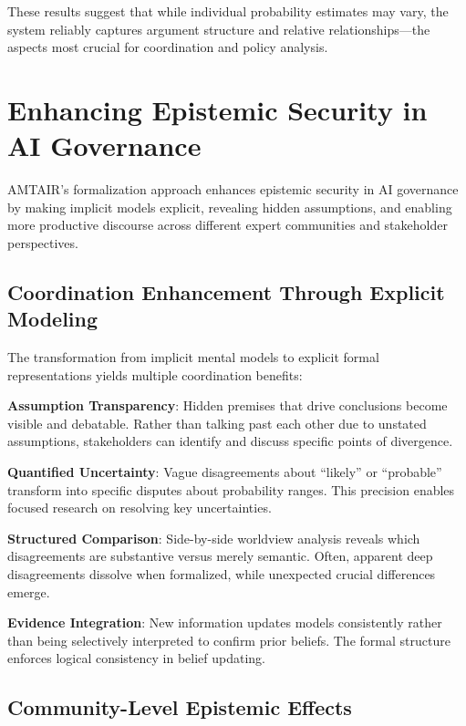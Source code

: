 \documentclass[
  11pt,
  letterpaper,
]{book}
\begin{document}
These results suggest that while individual probability estimates may
vary, the system reliably captures argument structure and relative
relationships---the aspects most crucial for coordination and policy
analysis.

\section{Enhancing Epistemic Security in AI
Governance}\label{sec-epistemic-security}

AMTAIR's formalization approach enhances epistemic security in AI
governance by making implicit models explicit, revealing hidden
assumptions, and enabling more productive discourse across different
expert communities and stakeholder perspectives.

\subsection{Coordination Enhancement Through Explicit
Modeling}\label{sec-coordination-enhancement}

The transformation from implicit mental models to explicit formal
representations yields multiple coordination benefits:

\textbf{Assumption Transparency}: Hidden premises that drive conclusions
become visible and debatable. Rather than talking past each other due to
unstated assumptions, stakeholders can identify and discuss specific
points of divergence.

\textbf{Quantified Uncertainty}: Vague disagreements about ``likely'' or
``probable'' transform into specific disputes about probability ranges.
This precision enables focused research on resolving key uncertainties.

\textbf{Structured Comparison}: Side-by-side worldview analysis reveals
which disagreements are substantive versus merely semantic. Often,
apparent deep disagreements dissolve when formalized, while unexpected
crucial differences emerge.

\textbf{Evidence Integration}: New information updates models
consistently rather than being selectively interpreted to confirm prior
beliefs. The formal structure enforces logical consistency in belief
updating.

\subsection{Community-Level Epistemic
Effects}\label{sec-community-effects}
\end{document}
